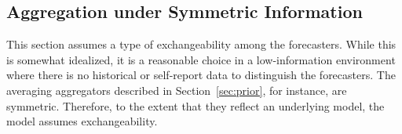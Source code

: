 \documentclass[11pt]{article}
\theoremstyle{definition}
\theoremstyle{definition}
\begin{document}


\subsection{Aggregation under Symmetric Information}
\label{compound2}
This section assumes a type of exchangeability among the forecasters.
While this is somewhat idealized, it is a reasonable choice in a
low-information environment where there is no historical or
self-report data to distinguish the forecasters.  The averaging
aggregators described in Section~\ref{sec:prior}, for instance, are
symmetric. Therefore, to the extent that they reflect an underlying
model, the model assumes exchangeability.
\end{document}
